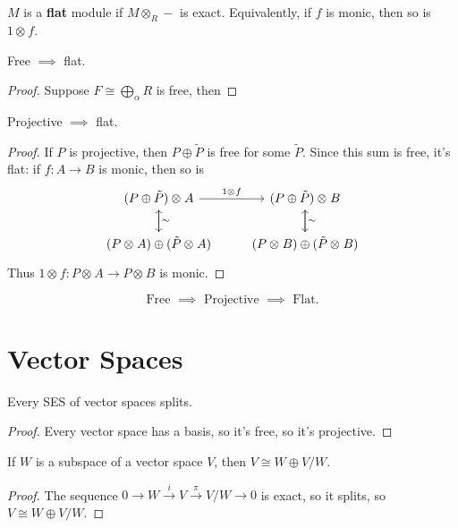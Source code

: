 \documentclass[twoside,10pt]{report}
\begin{document}
\begin{defn}[]
	$M$ is a \textbf{flat} module if $M \otimes_{R}-$ is exact. Equivalently, if $f$ is monic, then so is $1 \otimes_{}f$.
\end{defn}

\begin{prop}
Free $\implies $ flat.
\end{prop}
\begin{proof}
	Suppose $F \cong \bigoplus_{\alpha}R$ is free, then 
\end{proof}

\begin{cor}
Projective $\implies $ flat.
\end{cor}
\begin{proof}
	If $P$ is projective, then $P \oplus \tilde{P}$ is free for some $\tilde{P}$. Since this sum is free, it's flat: if $f:A\to B$ is monic, then so is
	\[
	\begin{tikzcd}
		(P\oplus \tilde{P})\otimes_{}A \rar{1\otimes_{}f} \dar{\sim} & (P\oplus \tilde{P})\otimes_{}B \dar{\sim} \\
		(P\otimes_{}A) \oplus (\tilde{P}\otimes_{}A) \uar & (P\otimes_{}B)\oplus (\tilde{P}\otimes_{}B) \uar
	\end{tikzcd}
	\] Thus $1\otimes_{}f:P\otimes_{}A\to P\otimes_{}B$ is monic.
\end{proof}

\begin{note}[]
\[
	\text{Free } \implies \text{ Projective } \implies \text{ Flat}.
\] 
\end{note}



\section{Vector Spaces}

\begin{prop}
Every SES of vector spaces splits.
\end{prop}
\begin{proof}
	Every vector space has a basis, so it's free, so it's projective.
\end{proof}

\begin{cor}
	If $W$ is a subspace of a vector space $V$, then $V \cong W \oplus V/W$.
\end{cor}
\begin{proof}
	The sequence $0\to W\stackrel{i}{\to } V\stackrel{\pi}{\to } V/W\to 0$ is exact, so it splits, so $V \cong W \oplus V/W$.
\end{proof}
\end{document}
